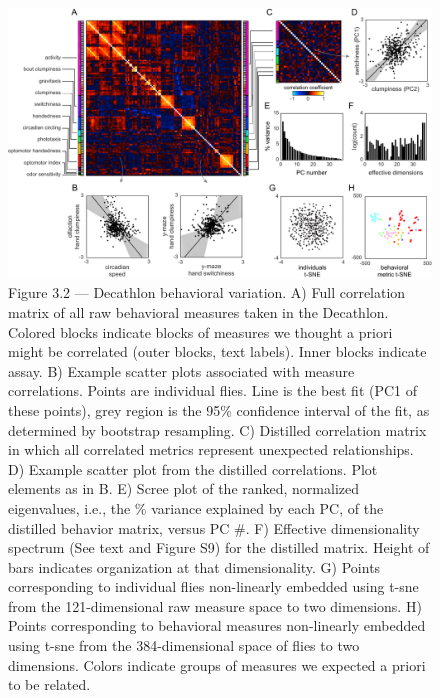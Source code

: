 \documentclass[12pt,letterpaper]{article}
\begin{document}
\begin{figure}[t!]
    \includegraphics[width=\textwidth]{../figures/chapter_3/fig_3-2.pdf}
    \caption{Figure 3.2 — Decathlon behavioral variation. A) Full correlation matrix of all raw behavioral measures taken in the Decathlon. Colored blocks indicate blocks of measures we thought a priori might be correlated (outer blocks, text labels). Inner blocks indicate assay. B) Example scatter plots associated with measure correlations. Points are individual flies. Line is the best fit (PC1 of these points), grey region is the 95\% confidence interval of the fit, as determined by bootstrap resampling. C) Distilled correlation matrix in which all correlated metrics represent unexpected relationships. D) Example scatter plot from the distilled correlations. Plot elements as in B. E) Scree plot of the ranked, normalized eigenvalues, i.e., the \% variance explained by each PC, of the distilled behavior matrix, versus PC #. F) Effective dimensionality spectrum (See text and Figure S9) for the distilled matrix. Height of bars indicates organization at that dimensionality. G) Points corresponding to individual flies non-linearly embedded using t-sne from the 121-dimensional raw measure space to two dimensions. H) Points corresponding to behavioral measures non-linearly embedded using t-sne from the 384-dimensional space of flies to two dimensions. Colors indicate groups of measures we expected a priori to be related.}
\end{figure}
\end{document}
